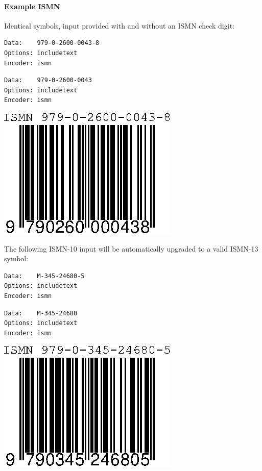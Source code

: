 \hypertarget{example-ismn}{%
\paragraph{Example ISMN}\label{example-ismn}}

Identical symbols, input provided with and without an ISMN check digit:

\begin{verbatim}
Data:    979-0-2600-0043-8
Options: includetext
Encoder: ismn
\end{verbatim}

\begin{verbatim}
Data:    979-0-2600-0043
Options: includetext
Encoder: ismn
\end{verbatim}

\includegraphics{images/ismn-1.eps}

The following ISMN-10 input will be automatically upgraded to a valid
ISMN-13 symbol:

\begin{verbatim}
Data:    M-345-24680-5
Options: includetext
Encoder: ismn
\end{verbatim}

\begin{verbatim}
Data:    M-345-24680
Options: includetext
Encoder: ismn
\end{verbatim}

\includegraphics{images/ismn-2.eps}

